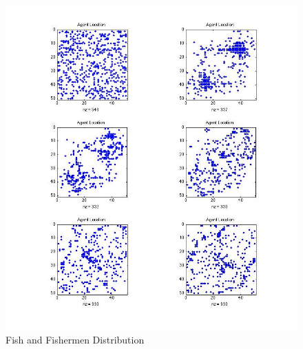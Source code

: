\documentclass{article}
\begin{document}
\begin{figure}[H]
	\begin{center}
		\includegraphics[scale=.30]{agents.jpg} 
		\caption{Fish and Fishermen Distribution}
	\end{center}
\end{figure} 
\end{document}
